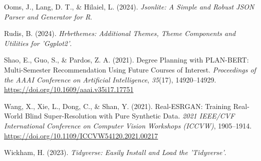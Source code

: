 \documentclass{article}
\newlength{\cslhangindent}
\newenvironment{CSLReferences}[2] %
 {\begin{list}{}{%
  \setlength{\itemindent}{0pt}
  \setlength{\leftmargin}{0pt}
  \setlength{\parsep}{0pt}
  \ifodd #1
   \setlength{\leftmargin}{\cslhangindent}
   \setlength{\itemindent}{-1\cslhangindent}
  \fi
  \setlength{\itemsep}{#2\baselineskip}}}
 {\end{list}}
\begin{document}
\begin{CSLReferences}{1}{0}
Ooms, J., Lang, D. T., \& Hilaiel, L. (2024). \emph{Jsonlite: {A Simple} and {Robust JSON Parser} and {Generator} for {R}}.

Rudis, B. (2024). \emph{Hrbrthemes: {Additional Themes}, {Theme Components} and {Utilities} for 'Ggplot2'}.

Shao, E., Guo, S., \& Pardos, Z. A. (2021). Degree {Planning} with {PLAN-BERT}: {Multi-Semester Recommendation Using Future Courses} of {Interest}. \emph{Proceedings of the AAAI Conference on Artificial Intelligence}, \emph{35}(17), 14920--14929. \url{https://doi.org/10.1609/aaai.v35i17.17751}

Wang, X., Xie, L., Dong, C., \& Shan, Y. (2021). Real-{ESRGAN}: {Training Real-World Blind Super-Resolution} with {Pure Synthetic Data}. \emph{2021 {IEEE}/{CVF International Conference} on {Computer Vision Workshops} ({ICCVW})}, 1905--1914. \url{https://doi.org/10.1109/ICCVW54120.2021.00217}

Wickham, H. (2023). \emph{Tidyverse: {Easily Install} and {Load} the '{Tidyverse}'}.

\end{CSLReferences}



\end{document}
